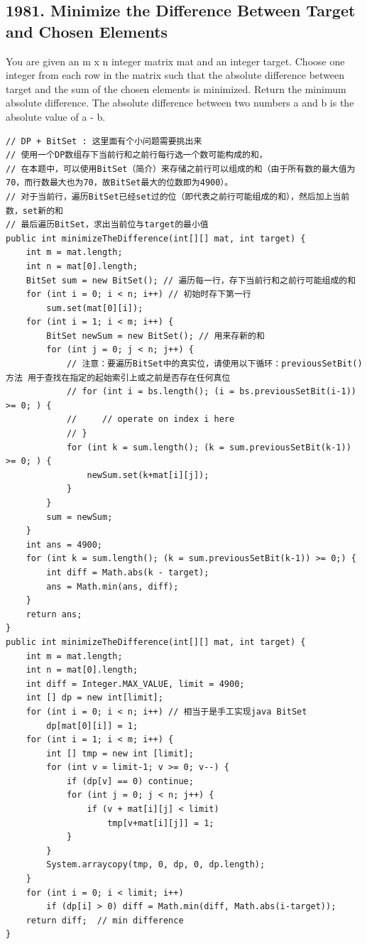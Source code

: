 \documentclass[9pt, b5paper]{article}
\begin{document}
\subsection{1981. Minimize the Difference Between Target and Chosen Elements}
\label{sec-4-42}
You are given an m x n integer matrix mat and an integer target.
Choose one integer from each row in the matrix such that the absolute difference between target and the sum of the chosen elements is minimized.
Return the minimum absolute difference.
The absolute difference between two numbers a and b is the absolute value of a - b.
\begin{verbatim}
// DP + BitSet : 这里面有个小问题需要挑出来
// 使用一个DP数组存下当前行和之前行每行选一个数可能构成的和，
// 在本题中，可以使用BitSet（简介）来存储之前行可以组成的和（由于所有数的最大值为70，而行数最大也为70，故BitSet最大的位数即为4900）。
// 对于当前行，遍历BitSet已经set过的位（即代表之前行可能组成的和），然后加上当前数，set新的和
// 最后遍历BitSet，求出当前位与target的最小值
public int minimizeTheDifference(int[][] mat, int target) {
    int m = mat.length;
    int n = mat[0].length;
    BitSet sum = new BitSet(); // 遍历每一行，存下当前行和之前行可能组成的和
    for (int i = 0; i < n; i++) // 初始时存下第一行
        sum.set(mat[0][i]);
    for (int i = 1; i < m; i++) {
        BitSet newSum = new BitSet(); // 用来存新的和
        for (int j = 0; j < n; j++) {
            // 注意：要遍历BitSet中的真实位，请使用以下循环：previousSetBit()方法 用于查找在指定的起始索引上或之前是否存在任何真位
            // for (int i = bs.length(); (i = bs.previousSetBit(i-1)) >= 0; ) {
            //     // operate on index i here
            // }
            for (int k = sum.length(); (k = sum.previousSetBit(k-1)) >= 0; ) {
                newSum.set(k+mat[i][j]);
            }
        }
        sum = newSum;
    }
    int ans = 4900;
    for (int k = sum.length(); (k = sum.previousSetBit(k-1)) >= 0;) {
        int diff = Math.abs(k - target);
        ans = Math.min(ans, diff);
    }
    return ans;
}
public int minimizeTheDifference(int[][] mat, int target) {
    int m = mat.length;
    int n = mat[0].length;
    int diff = Integer.MAX_VALUE, limit = 4900;
    int [] dp = new int[limit];
    for (int i = 0; i < n; i++) // 相当于是手工实现java BitSet
        dp[mat[0][i]] = 1;
    for (int i = 1; i < m; i++) {
        int [] tmp = new int [limit];
        for (int v = limit-1; v >= 0; v--) {
            if (dp[v] == 0) continue;
            for (int j = 0; j < n; j++) {
                if (v + mat[i][j] < limit)
                    tmp[v+mat[i][j]] = 1;
            }
        }
        System.arraycopy(tmp, 0, dp, 0, dp.length);
    }
    for (int i = 0; i < limit; i++) 
        if (dp[i] > 0) diff = Math.min(diff, Math.abs(i-target));
    return diff;  // min difference
}
\end{verbatim}
\end{document}
